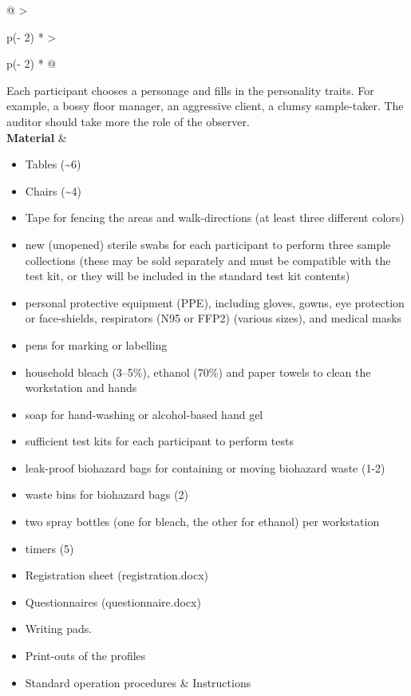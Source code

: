 \documentclass[
]{book}
\begin{document}
\begin{longtable}[]{@{}
  >{\raggedright\arraybackslash}p{(\columnwidth - 2\tabcolsep) * }
  >{\raggedright\arraybackslash}p{(\columnwidth - 2\tabcolsep) * }@{}}
Each participant chooses a personage and fills in the
personality traits. For example, a bossy floor
manager, an aggressive client, a clumsy sample-taker.
The auditor should take more the role of the
observer. \\
\textbf{Material} & \begin{minipage}[t]{\linewidth}\raggedright
\begin{itemize}
\item
  Tables (\textasciitilde6)
\item
  Chairs (\textasciitilde4)
\item
  Tape for fencing the areas and walk-directions
  (at least three different colors)
\item
  new (unopened) sterile swabs for each participant
  to perform three sample collections (these may be
  sold separately and must be compatible with the
  test kit, or they will be included in the
  standard test kit contents)
\item
  personal protective equipment (PPE), including
  gloves, gowns, eye protection or face-shields,
  respirators (N95 or FFP2) (various sizes), and
  medical masks
\item
  pens for marking or labelling
\item
  household bleach (3--5\%), ethanol (70\%) and paper
  towels to clean the workstation and hands
\item
  soap for hand-washing or alcohol-based hand gel
\item
  sufficient test kits for each participant to
  perform tests
\item
  leak-proof biohazard bags for containing or
  moving biohazard waste (1-2)
\item
  waste bins for biohazard bags (2)
\item
  two spray bottles (one for bleach, the other for
  ethanol) per workstation
\item
  timers (5)
\item
  Registration sheet (registration.docx)
\item
  Questionnaires (questionnaire.docx)
\item
  Writing pads.
\item
  Print-outs of the profiles
\item
  Standard operation procedures \& Instructions
\end{itemize}
\end{minipage} \\
\bottomrule
\end{longtable}
\end{document}
